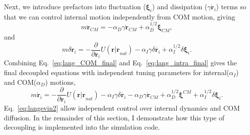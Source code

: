\documentclass[../talant.diss.submit.tex]{subfiles}
\begin{document}
Next, we introduce prefactors into
fluctuation ($\bm{\xi}_i$) and dissipation ($\gamma \dot{\bm{r}}_i$) terms so that we can
control internal motion independently from COM motion, giving
%
%
\begin{equation}
  \label{eq:lang_COM_final}
  m\ddot{\bm{r}}_{CM} = -\alpha_{D} \gamma\dot{\bm{r}}_{CM} + \alpha_{D}^{1/2} \bm{\xi}_{CM} ,
\end{equation}
and 
\begin{equation}
  \label{eq:lang_intra_final}
  m\delta \ddot{\bm{r}}_i  =  -\frac{ \partial}{\partial{\bm{r}_i}} U(\bm{r|r}_{nat})  
  -\alpha_{I} \gamma \delta \dot{\bm{r}_i} + \alpha_{I}^{1/2} \delta \bm{\xi}_i.
\end{equation}
%
%
Combining Eq.~\ref{eq:lang_COM_final} and Eq.~\ref{eq:lang_intra_final} gives the final decoupled equations with
independent tuning parameters for internal($\alpha_I$) and COM($\alpha_D$) motions,
\begin{equation}
  \label{eq:langevin2}
  m\ddot{\bm{r}}_i = -\frac{ \partial}{\partial{\bm{r}_i}} U(\bm{r|r}_{nat}) 
  - \alpha_{I} \gamma \delta \dot{\bm{r}_i} - \alpha_{D}\gamma \dot{\bm{r}}_{CM}
  + \alpha_{D}^{1/2} \bm{\xi}^{CM} + \alpha_{I}^{1/2} \delta \bm{\xi}_i.
\end{equation}
%
%
Eq.~\ref{eq:langevin2} allow independent control over internal dynamics and COM diffusion.
In the remainder of this section, I demonstrate how this type of decoupling is implemented into the simulation code.
%
%
%
%
%
%
%
%
\end{document}
